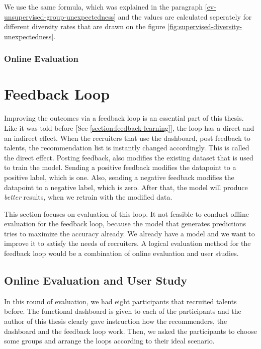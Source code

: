 We use the same formula, which was explained in the paragraph \ref{ev-unsupervised-group-unexpectedness} and the values are calculated seperately for different diversity rates that are drawn on the figure \ref{fig:supervised-diversity-unexpectedness}.


\subsubsection{Online Evaluation}


\section{Feedback Loop}\label{section:eval-feedback}

Improving the outcomes via a feedback loop is an essential part of this thesis. Like it was told before [See \ref{section:feedback-learning}], the loop has a direct and an indirect effect. When the recruiters that use the dashboard, post feedback to talents, the recommendation list is instantly changed accordingly. This is called the direct effect. Posting feedback, also modifies the existing dataset that is used to train the model. Sending a positive feedback modifies the datapoint to a positive label, which is one. Also, sending a negative feedback modifies the datapoint to a negative label, which is zero. After that, the model will produce \textit{better} results, when we retrain with the modified data.

This section focuses on evaluation of this loop. It not feasible to conduct offline evaluation for the feedback loop, because the model that generates predictions tries to maximize the accuracy already. We already have a model and we want to improve it to satisfy the needs of recruiters. A logical evaluation method for the feedback loop would be a combination of online evaluation and user studies.

\subsection{Online Evaluation and User Study}

In this round of evaluation, we had eight participants that recruited talents before. The functional dashboard is given to each of the participants and the author of this thesis clearly gave instruction how the recommenders, the dashboard and the feedback loop work. Then, we asked the participants to choose some groups and arrange the loops according to their ideal scenario. 

